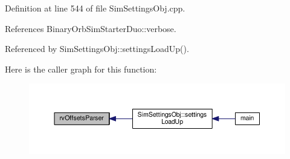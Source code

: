Definition at line 544 of file Sim\-Settings\-Obj.\-cpp.



References Binary\-Orb\-Sim\-Starter\-Duo\-::verbose.



Referenced by Sim\-Settings\-Obj\-::settings\-Load\-Up().



Here is the caller graph for this function\-:\nopagebreak
\begin{figure}[H]
\begin{center}
\leavevmode
\includegraphics[width=350pt]{_sim_settings_obj_8cpp_a4cd9aff0afb881a95ccc930b0dd6b20f_icgraph}
\end{center}
\end{figure}


